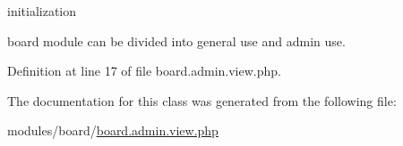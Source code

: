 initialization 

board module can be divided into general use and admin use.\par


Definition at line 17 of file board.\-admin.\-view.\-php.



The documentation for this class was generated from the following file\-:\begin{DoxyCompactItemize}
\item 
modules/board/\hyperlink{board_8admin_8view_8php}{board.\-admin.\-view.\-php}\end{DoxyCompactItemize}
